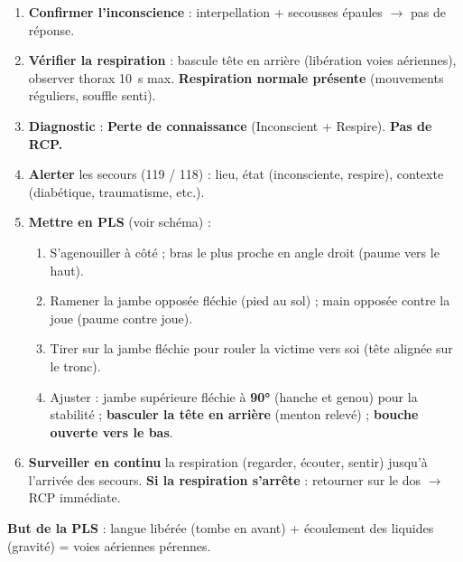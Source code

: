 \documentclass[11pt]{article}
\begin{document}
\begin{methode}
\begin{enumerate}
\item \textbf{Confirmer l'inconscience} : interpellation + secousses épaules $\rightarrow$ pas de réponse.
\item \textbf{Vérifier la respiration} : bascule tête en arrière (libération voies aériennes), observer thorax \SI{10}{s} max. \textbf{Respiration normale présente} (mouvements réguliers, souffle senti).
\item \textbf{Diagnostic} : \textbf{Perte de connaissance} (Inconscient + Respire). \textbf{Pas de RCP.}
\item \textbf{Alerter} les secours (119 / 118) : lieu, état (inconsciente, respire), contexte (diabétique, traumatisme, etc.).
\item \textbf{Mettre en PLS} (voir schéma) :
\begin{enumerate}
\item S'agenouiller à côté ; bras le plus proche en angle droit (paume vers le haut).
\item Ramener la jambe opposée fléchie (pied au sol) ; main opposée contre la joue (paume contre joue).
\item Tirer sur la jambe fléchie pour rouler la victime vers soi (tête alignée sur le tronc).
\item Ajuster : jambe supérieure fléchie à \textbf{90°} (hanche et genou) pour la stabilité ; \textbf{basculer la tête en arrière} (menton relevé) ; \textbf{bouche ouverte vers le bas}.
\end{enumerate}
\item \textbf{Surveiller en continu} la respiration (regarder, écouter, sentir) jusqu'à l'arrivée des secours. \textbf{Si la respiration s'arrête} : retourner sur le dos $\rightarrow$ RCP immédiate.
\end{enumerate}
\textbf{But de la PLS} : langue libérée (tombe en avant) + écoulement des liquides (gravité) = voies aériennes pérennes.
\end{methode}
\end{document}
